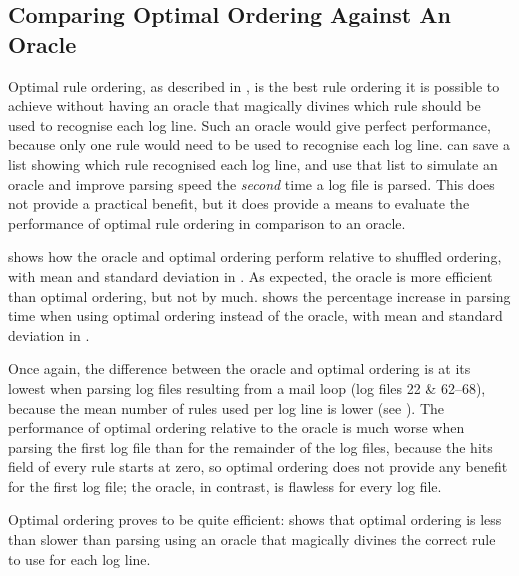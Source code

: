 \subsection{Comparing Optimal Ordering Against An Oracle}

\label{perfect rule ordering}

Optimal rule ordering, as described in , is the best rule ordering it is possible to achieve without
having an oracle that magically divines which rule should be used to
recognise each log line.  Such an oracle would give perfect performance,
because only one rule would need to be used to recognise each log line.
\parsername{} can save a list showing which rule recognised each log line,
and use that list to simulate an oracle and improve parsing speed the
\textit{second\/} time a log file is parsed.  This does not provide a
practical benefit, but it does provide a means to evaluate the performance
of optimal rule ordering in comparison to an oracle.

 shows how the oracle and optimal ordering perform relative
to shuffled ordering, with mean and standard deviation in .
As expected, the oracle is more efficient than optimal ordering, but not by
much.   shows the percentage increase in parsing
time when using optimal ordering instead of the oracle, with mean and
standard deviation in .

Once again, the difference between the oracle and optimal ordering is at
its lowest when parsing log files resulting from a mail loop (log files 22
\& 62--68), because the mean number of rules used per log line is lower
(see ).  The performance
of optimal ordering relative to the oracle is much worse when parsing the
first log file than for the remainder of the log files, because the hits
field of every rule starts at zero, so optimal ordering does not provide
any benefit for the first log file; the oracle, in contrast, is flawless
for every log file.

Optimal ordering proves to be quite efficient:  shows that optimal ordering is less than
 slower than parsing
using an oracle that magically divines the correct rule to use for each log
line.

